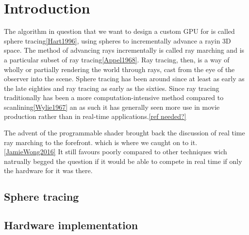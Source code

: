 \chapter{Introduction} 

The algorithm in question that we want to design a custom GPU for is called
sphere tracing\ref{Hart1996}, using spheres to incrementally advance a
ray\footnotemark in 3D space. The method of advancing rays incrementally is
called ray marching and is a particular subset of ray tracing\ref{Appel1968}.
Ray tracing, then, is a way of wholly or partially rendering the world through
rays, cast from the eye of the observer into the scene.  Sphere tracing has
been around since at least as early as the late eighties and ray tracing as
early as the sixties. Since ray tracing traditionally has been a more
computation-intensive method compared to scanlining\ref{Wylie1967} an as such
it has generally seen more use in movie production rather than in real-time
applications.\ref{ref needed?} 


The advent of the programmable shader brought back the discussion of real time
ray marching to the forefront. which is where we caught on to it.
\ref{JamieWong2016} It still favours poorly compared to other techniques wich
natrually begged the question if it would be able to compete in real time if
only the hardware for it was there.


\section{Sphere tracing}

\section{Hardware implementation}

